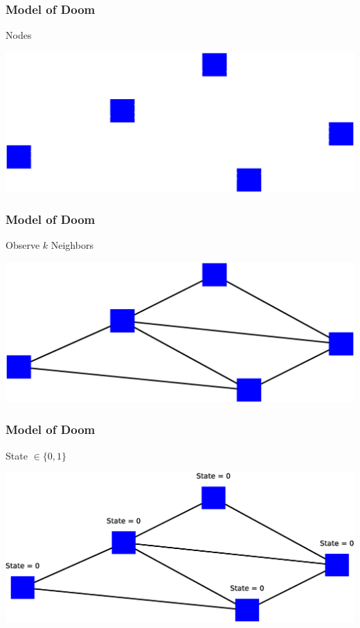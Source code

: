 \begin{frame}
    \frametitle{Model of Doom}
    \begin{itemize}
        \gitem Nodes
    \end{itemize}
    \vfill
    \includegraphics[width=\textwidth]{img/model1}
    \vfill
\end{frame}

\begin{frame}
    \frametitle{Model of Doom}
    \begin{itemize}
        \gitem Observe $k$ Neighbors
    \end{itemize}
    \vfill
    \includegraphics[width=\textwidth]{img/model2}
    \vfill
\end{frame}

\begin{frame}
    \frametitle{Model of Doom}
    \begin{itemize}
        \gitem State $\in \lbrace 0, 1 \rbrace$
    \end{itemize}
    \vfill
    \includegraphics[width=\textwidth]{img/model3}
    \vfill
\end{frame}


